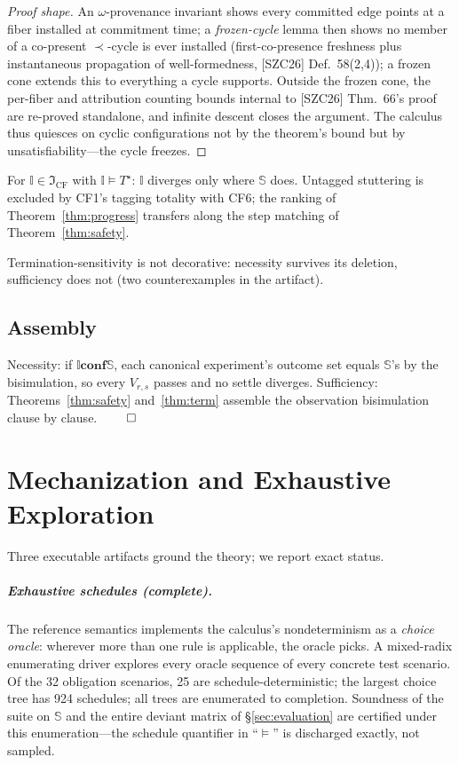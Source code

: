 \documentclass[sigplan,screen,review,nonacm]{acmart}
\newcommand{\Spec}{\ensuremath{\mathbb S}}
\newcommand{\Impl}{\ensuremath{\mathbb I}}
\newcommand{\conf}{\mathrel{\mathbf{conf}}}
\newcommand{\CF}{\ensuremath{\mathfrak I_{\mathrm{CF}}}}
\newcommand{\Tstar}{\ensuremath{T^{\star}}}
\newcommand{\SZC}{[SZC26]}
\begin{document}
\begin{proof}[Proof shape]
An $\omega$-provenance invariant shows every committed edge points at a fiber
installed at commitment time; a \emph{frozen-cycle} lemma then shows no member
of a co-present $\prec$-cycle is ever installed (first-co-presence freshness
plus instantaneous propagation of well-formedness, \SZC{} Def.~58(2,4)); a
frozen cone extends this to everything a cycle supports. Outside the frozen
cone, the per-fiber and attribution counting bounds internal to \SZC{}
Thm.~66's proof are re-proved standalone, and infinite descent closes the
argument. The calculus thus quiesces on cyclic configurations not by the
theorem's bound but by unsatisfiability---the cycle freezes.
\end{proof}

\begin{theorem}\label{thm:term}
For $\Impl \in \CF$ with $\Impl \models \Tstar$: $\Impl$ diverges only where
\Spec{} does. Untagged stuttering is excluded by CF1's tagging totality with
CF6; the ranking of Theorem~\ref{thm:progress} transfers along the step
matching of Theorem~\ref{thm:safety}.
\end{theorem}

Termination-sensitivity is not decorative: necessity survives its deletion,
sufficiency does not (two counterexamples in the artifact).

\subsection{Assembly}

Necessity: if $\Impl \conf \Spec$, each canonical experiment's outcome set
equals \Spec's by the bisimulation, so every $V_{r,s}$ passes and no settle
diverges. Sufficiency: Theorems~\ref{thm:safety} and~\ref{thm:term} assemble
the observation bisimulation clause by clause. \hfill$\qed$

\section{Mechanization and Exhaustive Exploration}\label{sec:mech}

Three executable artifacts ground the theory; we report exact status.

\subparagraph{Exhaustive schedules (complete).} The reference semantics
implements the calculus's nondeterminism as a \emph{choice oracle}: wherever
more than one rule is applicable, the oracle picks. A mixed-radix enumerating
driver explores every oracle sequence of every concrete test scenario. Of the
32 obligation scenarios, 25 are schedule-deterministic; the largest choice tree
has 924 schedules; all trees are enumerated to completion. Soundness of the
suite on \Spec{} and the entire deviant matrix of \S\ref{sec:evaluation} are
certified under this enumeration---the schedule quantifier in ``$\models$'' is
discharged exactly, not sampled.
\end{document}

